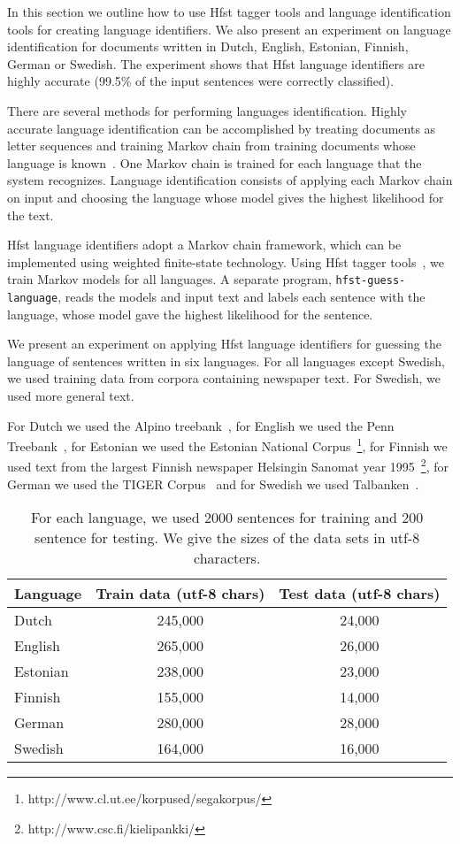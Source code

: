 \documentclass{llncs}
\begin{document}
In this section we outline how to use Hfst tagger tools and language
identification tools for creating language identifiers. We also
present an experiment on language identification for documents written
in Dutch, English, Estonian, Finnish, German or Swedish. The
experiment shows that Hfst language identifiers are highly accurate
(99.5\% of the input sentences were correctly classified).

There are several methods for performing languages
identification. Highly accurate language identification can be
accomplished by treating documents as letter sequences and training
Markov chain from training documents whose language is
known~\cite{cavnar/1994}. One Markov chain is trained for each
language that the system recognizes. Language identification consists
of applying each Markov chain on input and choosing the language whose
model gives the highest likelihood for the text. 

Hfst language identifiers adopt a Markov chain framework, which can be
implemented using weighted finite-state technology. Using Hfst tagger
tools~\cite{silfverberg/2011}, we train Markov models for all
languages. A separate program, {\tt hfst-guess-language}, reads the
models and input text and labels each sentence with the language,
whose model gave the highest likelihood for the sentence.

We present an experiment on applying Hfst language identifiers for
guessing the language of sentences written in six languages. For all
languages except Swedish, we used training data from corpora
containing newspaper text. For Swedish, we used more general text.

For Dutch we used the Alpino treebank~\cite{bouma/2000}, for English
we used the Penn Treebank~\cite{marcus/1993}, for Estonian we used the
Estonian National
Corpus~\footnote{http://www.cl.ut.ee/korpused/segakorpus/}, for
Finnish we used text from the largest Finnish newspaper Helsingin
Sanomat year 1995~\footnote{http://www.csc.fi/kielipankki/}, for
German we used the TIGER Corpus~\cite{brants/2002} and for Swedish we
used Talbanken~\cite{einarsson/1976}.

\begin{table}
\begin{center}
\begin{tabular}{l|cc}
Language & Train data (utf-8 chars) & Test data (utf-8 chars)\\
\hline
Dutch    & 245,000  & 24,000\\
English  & 265,000  & 26,000\\
Estonian & 238,000  & 23,000\\
Finnish  & 155,000  & 14,000\\
German   & 280,000  & 28,000\\
Swedish  & 164,000  & 16,000\\
\end{tabular}
\caption{For each language, we used 2000 sentences for training and
  200 sentence for testing. We give the sizes of the data sets in
  utf-8 characters.}\label{tab:lang-id-data}
\end{center}
\end{table}
\end{document}
